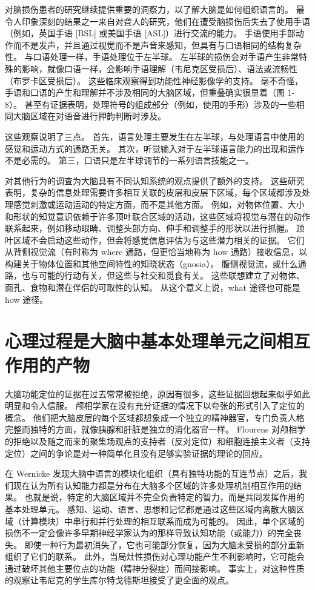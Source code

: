 对脑损伤患者的研究继续提供重要的洞察力，以了解大脑是如何组织语言的。 
最令人印象深刻的结果之一来自对聋人的研究，他们在遭受脑损伤后失去了使用手语（例如，英国手语 [BSL] 或美国手语 [ASL]）进行交流的能力。 
手语使用手部动作而不是发声，并且通过视觉而不是声音来感知，但具有与口语相同的结构复杂性。 
与口语处理一样，手语处理位于左半球。 左半球的损伤会对手语产生非常特殊的影响，就像口语一样，会影响手语理解（韦尼克区受损后）、语法或流畅性（布罗卡区受损后）。 
这些临床观察得到功能性神经影像学的支持。 
毫不奇怪，手语和口语的产生和理解并不涉及相同的大脑区域，但重叠确实很显着（图 1-8）。 
甚至有证据表明，处理符号的组成部分（例如，使用的手形）涉及的一些相同大脑区域在对语音进行押韵判断时涉及。


这些观察说明了三点。 
首先，语言处理主要发生在左半球，与处理语言中使用的感觉和运动方式的通路无关。 
其次，听觉输入对于左半球语言能力的出现和运作不是必需的。 
第三，口语只是左半球调节的一系列语言技能之一。


对其他行为的调查为大脑具有不同认知系统的观点提供了额外的支持。 
这些研究表明，复杂的信息处理需要许多相互关联的皮层和皮层下区域，每个区域都涉及处理感觉刺激或运动运动的特定方面，而不是其他方面。 
例如，对物体位置、大小和形状的知觉意识依赖于许多顶叶联合区域的活动，这些区域将视觉与潜在的动作联系起来，例如移动眼睛、调整头部方向、伸手和调整手的形状以进行抓握。 
顶叶区域不会启动这些动作，但会将感觉信息评估为与这些潜力相关的证据。 
它们从背侧视觉流（有时称为 where 通路，但更恰当地称为 how 通路）接收信息，以构建关于物体位置和其他空间特性的知晓状态（gnosia）。 
腹侧视觉流，或什么通路，也与可能的行动有关，但这些与社交和觅食有关。 
这些联想建立了对物体、面孔、食物和潜在伴侣的可取性的认知。 
从这个意义上说，what 途径也可能是 how 途径。



\section{心理过程是大脑中基本处理单元之间相互作用的产物}

大脑功能定位的证据在过去常常被拒绝，原因有很多，这些证据回想起来似乎如此明显和令人信服。 
颅相学家在没有充分证据的情况下以夸张的形式引入了定位的概念。 
他们把大脑皮层的每个区域都想象成一个独立的精神器官，专门负责人格完整而独特的方面，就像胰腺和肝脏是独立的消化器官一样。 
Flourens 对颅相学的拒绝以及随之而来的聚集场观点的支持者（反对定位）和细胞连接主义者（支持定位）之间的争论是对一种简单化且没有足够实验证据的理论的回应。


在 Wernicke 发现大脑中语言的模块化组织（具有独特功能的互连节点）之后，我们现在认为所有认知能力都是分布在大脑多个区域的许多处理机制相互作用的结果。 
也就是说，特定的大脑区域并不完全负责特定的智力，而是共同发挥作用的基本处理单元。 
感知、运动、语言、思想和记忆都是通过这些区域内离散大脑区域（计算模块）中串行和并行处理的相互联系而成为可能的。 
因此，单个区域的损伤不一定会像许多早期神经学家认为的那样导致认知功能（或能力）的完全丧失。 
即使一种行为最初消失了，它也可能部分恢复，因为大脑未受损的部分重新组织了它们的联系。 
此外，当局灶性损伤对心理功能产生不利影响时，它可能会通过破坏其他主要位点的功能（精神分裂症）而间接影响。 
事实上，对这种性质的观察让韦尼克的学生库尔特戈德斯坦接受了更全面的观点。


